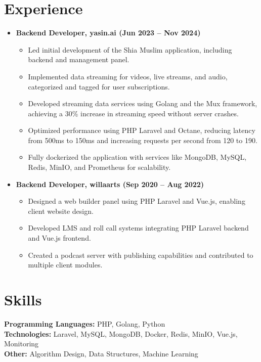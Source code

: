 \documentclass[10pt, letterpaper]{article}
\begin{document}
\section{Experience}
\begin{itemize}[leftmargin=*]
    \item \textbf{Backend Developer, yasin.ai (Jun 2023 -- Nov 2024)} \\
    \begin{itemize}[leftmargin=1.2em]
        \item Led initial development of the Shia Muslim application, including backend and management panel.
        \item Implemented data streaming for videos, live streams, and audio, categorized and tagged for user subscriptions.
        \item Developed streaming data services using Golang and the Mux framework, achieving a 30\% increase in streaming speed without server crashes.
        \item Optimized performance using PHP Laravel and Octane, reducing latency from 500ms to 150ms and increasing requests per second from 120 to 190.
        \item Fully dockerized the application with services like MongoDB, MySQL, Redis, MinIO, and Prometheus for scalability.
    \end{itemize}
    \item \textbf{Backend Developer, willaarts (Sep 2020 -- Aug 2022)} \\
    \begin{itemize}[leftmargin=1.2em]
        \item Designed a web builder panel using PHP Laravel and Vue.js, enabling client website design.
        \item Developed LMS and roll call systems integrating PHP Laravel backend and Vue.js frontend.
        \item Created a podcast server with publishing capabilities and contributed to multiple client modules.
    \end{itemize}
\end{itemize}

\section{Skills}
\textbf{Programming Languages:} PHP, Golang, Python \\
\textbf{Technologies:} Laravel, MySQL, MongoDB, Docker, Redis, MinIO, Vue.js, Monitoring \\
\textbf{Other:} Algorithm Design, Data Structures, Machine Learning
\end{document}
